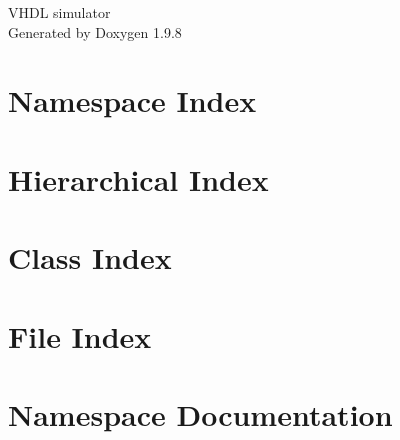 \documentclass[twoside]{book}
\newcommand{\+}{\discretionary{\mbox{\scriptsize$\hookleftarrow$}}{}{}}
\newcommand{\clearemptydoublepage}{%
    \newpage{\pagestyle{empty}\cleardoublepage}%
  }
\begin{document}
  \raggedbottom
    \hypersetup{pageanchor=false,
                bookmarksnumbered=true,
                pdfencoding=unicode
               }
  \begin{titlepage}
  \vspace*{7cm}
  \begin{center}%
  {\Large VHDL simulator}\\
  \vspace*{1cm}
  {\large Generated by Doxygen 1.9.8}\\
  \end{center}
  \end{titlepage}
  \clearemptydoublepage
  \tableofcontents
  \clearemptydoublepage
  \hypersetup{pageanchor=true}
\chapter{Namespace Index}

\chapter{Hierarchical Index}

\chapter{Class Index}

\chapter{File Index}

\chapter{Namespace Documentation}

\end{document}
